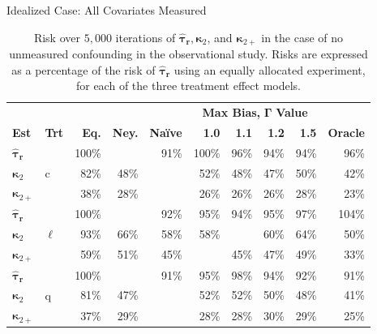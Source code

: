 \documentclass[usenames,dvipsnames]{beamer}
\newcommand{\taur}{\boldsymbol{\hat \tau_r}}
\newcommand{\bskap}{\boldsymbol{ \kappa}}
\theoremstyle{definition} %
\begin{document}
\begin{frame}{Idealized Case: All Covariates Measured} 
\small

\begin{table}[h]
\centering
\begin{tabular}{ll|rrr|rrrr|r}
\toprule
 & & & & &  \multicolumn{4}{c|}{\textbf{Max Bias, }$\boldsymbol \Gamma$ \textbf{Value} } &  \\ 
\textbf{Est}  & \textbf{Trt}    & \textbf{Eq.} & \textbf{Ney.} & \textbf{Naïve} & \textbf{1.0} & \textbf{1.1} & \textbf{1.2} & \textbf{1.5} & \textbf{Oracle} \\ \midrule
$\taur$   & \multirow{3}{*}{c} & 100\% & \textbf{\color{ForestGreen}{87\%}} & 91\% & 100\% & 96\% & 94\% & 94\% & 96\% \\
$\bskap_2$      &  & 82\% & 48\% & \textbf{\color{ForestGreen}{44\%}} & 52\% & 48\% & 47\% & 50\% & 42\% \\
$\bskap_{2+}$ & &38\% & 28\% & \textbf{\color{ForestGreen}{26\%}} & 26\% & 26\% & 26\% & 28\% & 23\% \\ \midrule
$\taur$   &  \multirow{3}{*}{$\ell$} & 100\% & \textbf{\color{ForestGreen}{89\%}} & 92\% & 95\% & 94\% & 95\% & 97\% & 104\% \\
$\bskap_2$      &  & 93\% & 66\% & 58\% & 58\% & \textbf{\color{ForestGreen}{57\%}} & 60\% & 64\% & 50\% \\
$\bskap_{2+}$ & & 59\% & 51\% & 45\% & \textbf{\color{ForestGreen}{43\%}} & 45\% & 47\% & 49\% & 33\% \\ \midrule				
$\taur$   & \multirow{3}{*}{q} & 100\% & \textbf{\color{ForestGreen}{86\%}} & 91\% & 95\% & 98\% & 94\% & 92\% & 91\% \\
$\bskap_{2}$  & &81\% & 47\% & \textbf{\color{ForestGreen}{45\%}} & 52\% & 52\% & 50\% & 48\% & 41\% \\
$\bskap_{2+}$ & & 37\% & 29\% & \textbf{\color{ForestGreen}{27\%}} & 28\% & 28\% & 30\% & 29\% & 25\% \\ \bottomrule
 \end{tabular} 
\caption{\label{tab:idealized} Risk over $5,000$ iterations of $\taur, \bskap_2$, and $\bskap_{2+}$ in the case of no unmeasured confounding in the observational study. Risks are expressed as a percentage of the risk of $\taur$ using an equally allocated experiment, for each of the three treatment effect models.}
\end{table}\end{frame}
\end{document}
